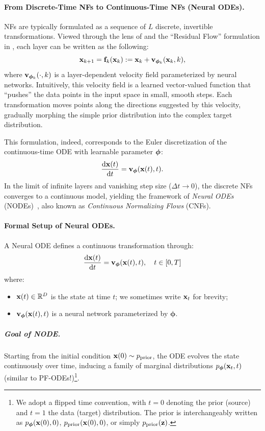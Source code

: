\paragraph{From Discrete-Time NFs to Continuous-Time NFs (Neural ODEs).} 
NFs are typically formulated as a sequence of $L$ discrete, invertible transformations. Viewed through the lens of  and the ``Residual Flow'' formulation in , each layer can be written as the following:
\[
{\mathbf{x}}_{k+1} = {\mathbf{f}}_k({\mathbf{x}}_k) := {\mathbf{x}}_k + {\mathbf{v}}_{\bm{\phi}_k}({\mathbf{x}}_k, k),
\]
where ${\mathbf{v}}_{\bm{\phi}_k}(\cdot, k)$ is a layer-dependent velocity field parameterized by neural networks. Intuitively, this velocity field is a learned vector-valued function that ``pushes'' the data points in the input space in small, smooth steps. Each transformation moves points along the directions suggested by this velocity, gradually morphing the simple  prior distribution into the complex target distribution. 


This formulation, indeed, corresponds to the Euler discretization of the continuous-time ODE with learnable parameter ${\bm{\phi}}$:
\[
\frac{\mathop{}\!\mathrm{d} {\mathbf{x}}(t)}{\mathop{}\!\mathrm{d} t} = {\mathbf{v}}_{\bm{\phi}}({\mathbf{x}}(t), t).
\]
 In the limit of infinite layers and vanishing step size ($\Delta t \to 0$), the discrete NFs converges to a continuous model, yielding the framework of \emph{Neural ODEs} (NODEs)~\citep{chen2018neural}, also known as \emph{Continuous Normalizing Flows} (CNFs).



\paragraph{Formal Setup of Neural ODEs.}
A Neural ODE defines a continuous transformation through:
\begin{align}\label{eq:neural-ode}
    \frac{\mathop{}\!\mathrm{d} {\mathbf{x}}(t)}{\mathop{}\!\mathrm{d} t} = {\mathbf{v}}_{\bm{\phi}}({\mathbf{x}}(t), t),\quad t\in [0,T]
\end{align}
where:
\begin{itemize}
    \item $ {\mathbf{x}}(t) \in \mathbb{R}^D $ is the state at time $t$; we sometimes write ${\mathbf{x}}_t$ for brevity;
    \item ${\mathbf{v}}_{\bm{\phi}}({\mathbf{x}}(t), t)$ is a neural network parameterized by $\bm{\phi}$.
\end{itemize}


\subparagraph{Goal of NODE.}
Starting from the initial condition ${\mathbf{x}}(0) \sim p_{\text{prior}}$, the ODE evolves the state continuously over time, inducing a family of marginal distributions $p_{\bm{\phi}}({\mathbf{x}}_t, t)$ (similar to PF-ODEs!)\footnote{We adopt a flipped time convention, with $t = 0$ denoting the prior (source) and $t = 1$ the data (target) distribution. The prior is interchangeably written as $p_{\bm{\phi}}({\mathbf{x}}(0), 0)$, $p_{\text{prior}}({\mathbf{x}}(0), 0)$, or simply $p_{\text{prior}}({\mathbf{z}})$.
}. 

